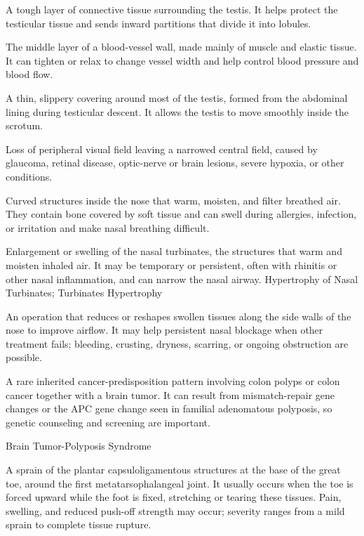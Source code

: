  A tough layer of connective tissue surrounding the testis. It helps protect the testicular tissue and sends inward partitions that divide it into lobules.

 The middle layer of a blood-vessel wall, made mainly of muscle and elastic tissue. It can tighten or relax to change vessel width and help control blood pressure and blood flow.

 A thin, slippery covering around most of the testis, formed from the abdominal lining during testicular descent. It allows the testis to move smoothly inside the scrotum.

 Loss of peripheral visual field leaving a narrowed central field, caused by glaucoma, retinal disease, optic-nerve or brain lesions, severe hypoxia, or other conditions.

 Curved structures inside the nose that warm, moisten, and filter breathed air. They contain bone covered by soft tissue and can swell during allergies, infection, or irritation and make nasal breathing difficult.

 Enlargement or swelling of the nasal turbinates, the structures that warm and moisten inhaled air. It may be temporary or persistent, often with rhinitis or other nasal inflammation, and can narrow the nasal airway.
\synonyms
Hypertrophy of Nasal Turbinates; Turbinates Hypertrophy

 An operation that reduces or reshapes swollen tissues along the side walls of the nose to improve airflow. It may help persistent nasal blockage when other treatment fails; bleeding, crusting, dryness, scarring, or ongoing obstruction are possible.

 A rare inherited cancer-predisposition pattern involving colon polyps or colon cancer together with a brain tumor. It can result from mismatch-repair gene changes or the APC gene change seen in familial adenomatous polyposis, so genetic counseling and screening are important.

\synonyms
Brain Tumor-Polyposis Syndrome

 A sprain of the plantar capsuloligamentous structures at
the base of the great toe, around the first metatarsophalangeal joint. It
usually occurs when the toe is forced upward while the foot is fixed,
stretching or tearing these tissues. Pain, swelling, and reduced push-off
strength may occur; severity ranges from a mild sprain to complete tissue
rupture.

